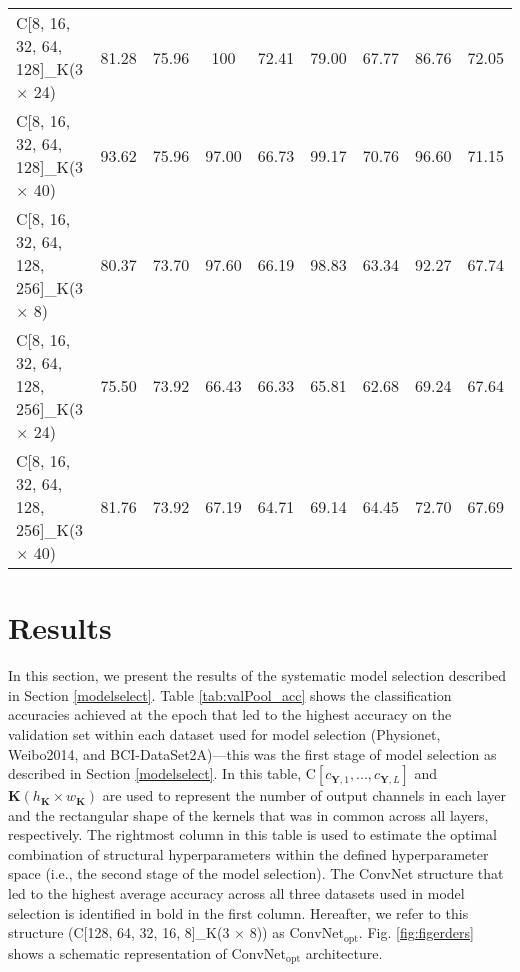\documentclass{ieeeaccess}
\begin{document}
{\begin{table*}[htb]
\begin{tabular}{|l|cc|cc|cc|cc|}
        C[8, 16, 32, 64, 128]\_K(3 $\times$ 24)      &      81.28 &       75.96 &       100 &            72.41 &      79.00 &      67.77 &      86.76 &      72.05 \\
        C[8, 16, 32, 64, 128]\_K(3 $\times$ 40)      &      93.62 &       75.96 &        97.00 &         66.73 &      99.17 &      70.76 &      96.60 &      71.15 \\
        C[8, 16, 32, 64, 128, 256]\_K(3 $\times$ 8)  &      80.37 &       73.70 &        97.60 &         66.19 &      98.83 &      63.34 &      92.27 &      67.74 \\
        C[8, 16, 32, 64, 128, 256]\_K(3 $\times$ 24) &      75.50 &       73.92 &        66.43 &         66.33 &      65.81 &      62.68 &      69.24 &      67.64 \\
        C[8, 16, 32, 64, 128, 256]\_K(3 $\times$ 40) &      81.76 &       73.92 &        67.19 &         64.71 &      69.14 &      64.45 &      72.70 &      67.69 \\
        \bottomrule
    \end{tabular}
\end{table*}    
    \section{Results} 
    \label{sec:results}
    
    In this section, we present the results of the systematic model selection described in Section \ref{modelselect}. Table \ref{tab:valPool_acc} shows the classification accuracies achieved at the epoch that led to the highest accuracy on the validation set within each dataset used for model selection (Physionet, Weibo2014, and BCI-DataSet2A)---this was the first stage of model selection as described in Section \ref{modelselect}. In this table, ${\text{C}}[c_{\mathbf{Y}, 1}, ..., c_{\mathbf{Y}, L}]$ and $\mathbf{\mathbf{K}}(h_{\mathbf{K}} \times w_{\mathbf{K}})$ are used to represent the number of output channels in each layer and the rectangular shape of the kernels that was in common across all layers, respectively. The rightmost column in this table is used to estimate the optimal combination of structural hyperparameters within the defined hyperparameter space (i.e., the second stage of the model selection). The ConvNet structure that led to the highest average accuracy across all three datasets used in model selection is identified in bold in the first column. Hereafter, we refer to this structure (C[128, 64, 32, 16, 8]\_K(3 $\times$ 8)) as $\text{ConvNet}_{\text{opt}}$. Fig. \ref{fig:figerders} shows a schematic representation of $\text{ConvNet}_{\text{opt}}$ architecture.
    
}
\end{document}
